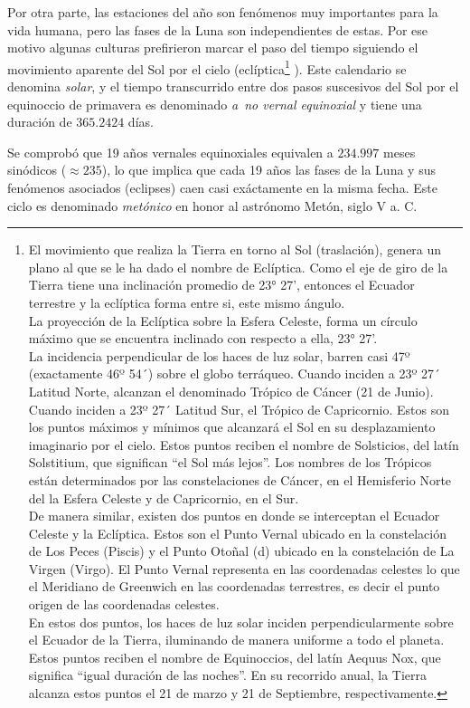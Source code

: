 \documentclass[a4paper,12pt,twoside]{article}
\begin{document}
Por otra parte, las estaciones del a\~no son fen\'omenos muy importantes para la vida humana, pero las fases de la Luna son independientes de estas. Por ese motivo algunas culturas prefirieron marcar el paso del tiempo siguiendo el movimiento aparente del Sol por el cielo (ecl\'iptica\footnote{El movimiento que realiza la Tierra en torno al Sol (traslación), genera un plano al que se le ha dado el nombre de Eclíptica. Como el eje de giro de la Tierra tiene una inclinación promedio de 23° 27', entonces el Ecuador terrestre y la eclíptica forma entre si, este mismo ángulo.\\La proyección de la Eclíptica sobre la Esfera Celeste, forma un círculo máximo que se encuentra inclinado con respecto a ella, 23° 27'.
\\ La incidencia perpendicular de los haces de luz solar, barren casi 47º (exactamente 46º 54´) sobre el globo terráqueo. Cuando inciden a 23º 27´ Latitud Norte, alcanzan el denominado Trópico de Cáncer (21 de Junio). Cuando inciden a 23º 27´ Latitud Sur, el Trópico de Capricornio. Estos son los puntos máximos y mínimos que alcanzará el Sol en su desplazamiento imaginario por el cielo. Estos puntos reciben el nombre de Solsticios, del latín Solstitium, que significan “el Sol más lejos”. Los nombres de los Trópicos están determinados por las constelaciones de Cáncer, en el Hemisferio Norte del la Esfera Celeste y de Capricornio, en el Sur.
\\ De manera similar, existen dos puntos en donde se interceptan el Ecuador Celeste y la Eclíptica. Estos son el Punto Vernal  ubicado en la constelación de Los Peces (Piscis) y el Punto Otoñal (d) ubicado en la constelación de La Virgen (Virgo). El Punto Vernal representa en las coordenadas celestes lo que el Meridiano de Greenwich en las coordenadas terrestres, es decir el punto origen de las coordenadas celestes.
\\ En estos dos puntos, los haces de luz solar inciden perpendicularmente sobre el Ecuador de la Tierra, iluminando de manera uniforme a todo el planeta. Estos puntos reciben el nombre de Equinoccios, del latín Aequus Nox, que significa “igual duración de las noches”. En su recorrido anual, la Tierra alcanza estos puntos el 21 de marzo y 21 de Septiembre, respectivamente. }
). Este calendario se denomina \emph{solar}, y el tiempo transcurrido entre dos pasos suscesivos del Sol por el equinoccio de primavera es denominado \emph{a~no vernal equinoxial} y tiene una duraci\'on de $365.2424$ d\'ias.

Se comprob\'o que  19 a\~nos vernales equinoxiales equivalen a $234.997$ meses sin\'odicos ($\approx 235$), lo que implica que cada 19 a\~nos las fases de la Luna y sus fen\'omenos asociados (eclipses) caen casi ex\'actamente en la misma fecha. Este ciclo es denominado \emph{met\'onico} en honor al astr\'onomo Met\'on, siglo V a. C.
\end{document}
